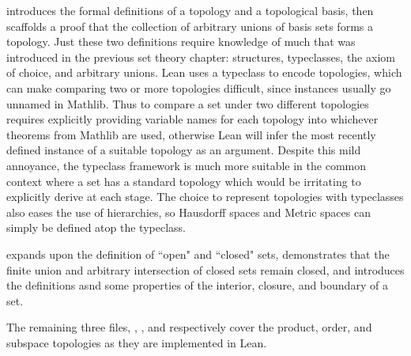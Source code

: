  introduces the formal definitions of a topology and a 
topological basis, then scaffolds a proof that the collection of arbitrary
unions of basis sets forms a topology. Just these two definitions require 
knowledge of much that was introduced in the previous set theory chapter:
structures, typeclasses, the axiom of choice, and arbitrary unions. Lean
uses a typeclass  to encode topologies, which can 
make comparing two or more topologies difficult, since instances usually
go unnamed in Mathlib. Thus to compare a set under two different topologies
requires explicitly providing variable names for each topology into whichever
theorems from Mathlib are used, otherwise Lean will infer the most recently 
defined instance of a suitable topology as an argument. Despite this mild 
annoyance, the typeclass framework is much more suitable in the common context 
where a set has a standard topology which would be irritating to explicitly 
derive at each stage. The choice to represent topologies with typeclasses also 
eases the use of hierarchies, so Hausdorff spaces and Metric spaces can 
simply be defined atop the  typeclass.

 expands upon the definition of ``open" and ``closed" sets, 
demonstrates that the finite union and arbitrary intersection of closed sets
remain closed, and introduces the definitions asnd some properties of the 
interior, closure, and boundary of a set.

The remaining three files, , ,
and  respectively cover the product, order, 
and subspace topologies as they are implemented in Lean. 